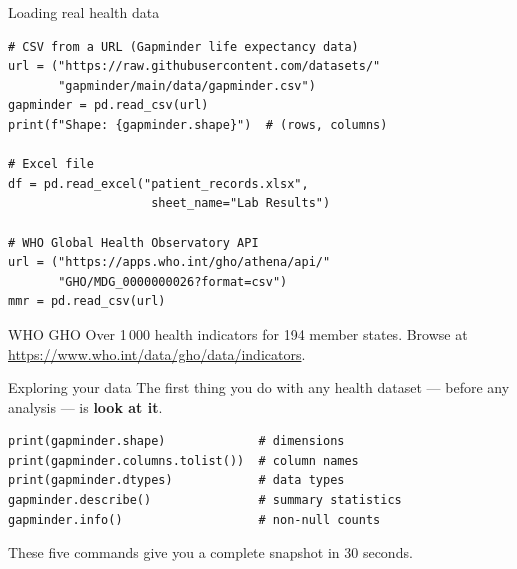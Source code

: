 \documentclass[aspectratio=169,11pt]{beamer}
\begin{document}
\begin{frame}[fragile]{Loading real health data}
\begin{verbatim}
# CSV from a URL (Gapminder life expectancy data)
url = ("https://raw.githubusercontent.com/datasets/"
       "gapminder/main/data/gapminder.csv")
gapminder = pd.read_csv(url)
print(f"Shape: {gapminder.shape}")  # (rows, columns)

# Excel file
df = pd.read_excel("patient_records.xlsx",
                    sheet_name="Lab Results")

# WHO Global Health Observatory API
url = ("https://apps.who.int/gho/athena/api/"
       "GHO/MDG_0000000026?format=csv")
mmr = pd.read_csv(url)
\end{verbatim}

\begin{exampleblock}{WHO GHO}
Over 1\,000 health indicators for 194 member states. Browse at \url{https://www.who.int/data/gho/data/indicators}.
\end{exampleblock}
\end{frame}

\begin{frame}[fragile]{Exploring your data}
The first thing you do with any health dataset --- \alert{before any analysis} --- is \textbf{look at it}.

\begin{verbatim}
print(gapminder.shape)             # dimensions
print(gapminder.columns.tolist())  # column names
print(gapminder.dtypes)            # data types
gapminder.describe()               # summary statistics
gapminder.info()                   # non-null counts
\end{verbatim}

\vspace{4pt}
These five commands give you a complete snapshot in 30 seconds.
\end{frame}
\end{document}
